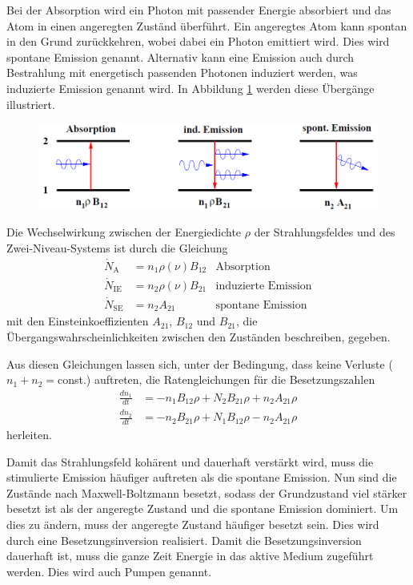 \documentclass[]{scrartcl}
\begin{document}
Bei der Absorption wird ein Photon mit passender Energie absorbiert und das Atom in einen angeregten Zuständ überführt. 
Ein angeregtes Atom kann spontan in den Grund zurückkehren, wobei dabei ein Photon emittiert wird. Dies wird spontane Emission genannt.
Alternativ kann eine Emission auch durch Bestrahlung mit energetisch passenden Photonen induziert werden, was induzierte Emission genannt wird.
In Abbildung \ref{fig:schema_uebergaenge} werden diese Übergänge illustriert.
\begin{figure}[h]
 \centering
 \includegraphics[width=12cm]{images/schema_uebergaenge.png}
 \label{fig:schema_uebergaenge}
\end{figure}

Die Wechselwirkung zwischen der Energiedichte $\rho$ der Strahlungsfeldes und des Zwei-Niveau-Systems ist durch die Gleichung
\begin{align}
 \dot{N}_\text{A}   & =n_1 \rho\left(\nu \right)B_{12}  &\text{Absorption} \\
 \dot{N}_\text{IE}  & =n_2 \rho\left(\nu \right)B_{21}  &\text{induzierte Emission} \\
 \dot{N}_\text{SE}  & =n_2 A_{21}                       &\text{spontane Emission}
\end{align}
mit den Einsteinkoeffizienten $A_{21}$, $B_{12}$ und $B_{21}$, die Übergangswahrscheinlichkeiten zwischen den Zuständen beschreiben, gegeben.

Aus diesen Gleichungen lassen sich, unter der Bedingung, dass keine Verluste ($n_1+n_2=$const.) auftreten, die Ratengleichungen für die Besetzungszahlen
\begin{align}
 \frac{d n_1}{d t}&=-n_1B_{12}\rho+N_2B_{21}\rho+n_2A_{21}\rho \\
 \frac{d n_2}{d t}&=-n_2B_{21}\rho+N_1B_{12}\rho-n_2A_{21}\rho
\end{align}
herleiten.

Damit das Strahlungsfeld kohärent und dauerhaft verstärkt wird, muss die stimulierte Emission häufiger auftreten als die spontane Emission. 
Nun sind die Zustände nach Maxwell-Boltzmann besetzt, sodass der Grundzustand viel stärker besetzt ist als der angeregte Zustand und die spontane Emission dominiert.
Um dies zu ändern, muss der angeregte Zustand häufiger besetzt sein. Dies wird durch eine Besetzungsinversion realisiert. 
Damit die Besetzungsinversion dauerhaft ist, muss die ganze Zeit Energie in das aktive Medium zugeführt werden. Dies wird auch Pumpen genannt.
\end{document}
